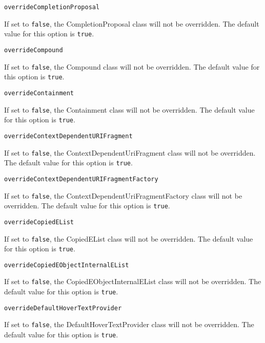 \noindent\texttt{overrideCompletionProposal}
\begin{myindentpar}{1cm}
If set to \texttt{false}, the CompletionProposal class will not be overridden. The default value for this option is \texttt{true}.
\end{myindentpar}

\noindent\texttt{overrideCompound}
\begin{myindentpar}{1cm}
If set to \texttt{false}, the Compound class will not be overridden. The default value for this option is \texttt{true}.
\end{myindentpar}

\noindent\texttt{overrideContainment}
\begin{myindentpar}{1cm}
If set to \texttt{false}, the Containment class will not be overridden. The default value for this option is \texttt{true}.
\end{myindentpar}

\noindent\texttt{overrideContextDependentURIFragment}
\begin{myindentpar}{1cm}
If set to \texttt{false}, the ContextDependentUriFragment class will not be overridden. The default value for this option is \texttt{true}.
\end{myindentpar}

\noindent\texttt{overrideContextDependentURIFragmentFactory}
\begin{myindentpar}{1cm}
If set to \texttt{false}, the ContextDependentUriFragmentFactory class will not be overridden. The default value for this option is \texttt{true}.
\end{myindentpar}

\noindent\texttt{overrideCopiedEList}
\begin{myindentpar}{1cm}
If set to \texttt{false}, the CopiedEList class will not be overridden. The default value for this option is \texttt{true}.
\end{myindentpar}

\noindent\texttt{overrideCopiedEObjectInternalEList}
\begin{myindentpar}{1cm}
If set to \texttt{false}, the CopiedEObjectInternalEList class will not be overridden. The default value for this option is \texttt{true}.
\end{myindentpar}

\noindent\texttt{overrideDefaultHoverTextProvider}
\begin{myindentpar}{1cm}
If set to \texttt{false}, the DefaultHoverTextProvider class will not be overridden. The default value for this option is \texttt{true}.
\end{myindentpar}

